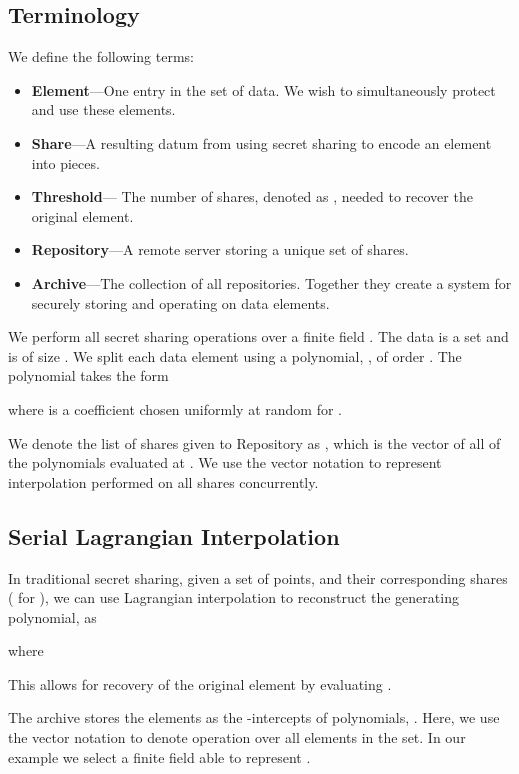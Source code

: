 \subsection{Terminology}\label{ssec:sif:terminology}
We define the following terms:

\begin{itemize}
\item {\bf Element}---One entry in the set of data. We wish to simultaneously
protect and use these elements.
\item {\bf Share}---A resulting datum from using secret sharing to encode an
  element into  pieces.
\item {\bf Threshold}--- The number of shares, denoted as , needed to recover the original
  element.
\item {\bf Repository}---A remote server storing a unique set of shares.
\item {\bf Archive}---The collection of all  repositories. Together they
  create a system for securely storing and operating on data elements.
\end{itemize}

We perform all secret sharing operations over a finite field .
The data is a set  and is of size .
We split each data element  using a polynomial,
, of order .  The polynomial takes the form

where  is a coefficient chosen uniformly at random for
. 

We denote the list of shares given to Repository  as
, which is the vector of all of the polynomials
evaluated at .  We use the vector notation to represent
interpolation performed on all shares concurrently.

\subsection{Serial Lagrangian Interpolation}\label{ssec:sif:sli}

In traditional secret sharing,
given a set of  points,  and their
corresponding shares ( for ), we can use
Lagrangian interpolation to reconstruct the generating polynomial,
 as


where


This allows for recovery of the original element by evaluating
.

The archive stores the elements as the -intercepts of polynomials,
.  Here, we use the vector notation to denote operation 
over all elements in the set. In our example we
select a finite field able to represent .

